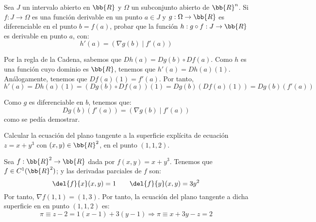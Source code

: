 \begin{ejercicio}
    Sea $J$ un intervalo abierto en $\bb{R}$ y $\Omega$ un subconjunto abierto de $\bb{R}^n$. Si $f:J\to \Omega$ es una función derivable en un punto $a\in J$ y $g:\Omega\to \bb{R}$ es diferenciable en el punto $b=f(a)$, probar que la función $h:g\circ f:J\to \bb{R}$ es derivable en punto $a$, con:
    \begin{equation*}
        h'(a) = (\nabla g(b)\mid f'(a))
    \end{equation*}

    Por la regla de la Cadena, sabemos que $Dh(a) = Dg(b)\circ Df(a)$.
    Como $h$ es una función cuyo dominio es $\bb{R}$, tenemos que $h'(a)=Dh(a)(1)$. Análogamente, tenemos que $Df(a)(1) = f'(a)$. Por tanto,
    \begin{equation*}
        h'(a) = Dh(a)(1) = (Dg(b)\circ Df(a))(1) = Dg(b)(Df(a)(1)) = Dg(b)(f'(a))
    \end{equation*}

    Como $g$ es diferenciable en $b$, tenemos que:
    \begin{equation*}
        Dg(b)(f'(a)) = \left(\nabla g(b)\mid f'(a)\right)
    \end{equation*}
    como se pedía demostrar.
\end{ejercicio}

\begin{ejercicio}
    Calcular la ecuación del plano tangente a la superficie explícita de ecuación $z = x + y^3$ con $(x,y)\in\bb{R}^2$, en el punto $(1,1,2)$.

    Sea $f:\bb{R}^2\to \bb{R}$ dada por $f(x,y) = x+y^3$. Tenemos que $f\in C^1(\bb{R}^2)$; y las derivadas parciales de $f$ son:
    \begin{equation*}
        \del{f}{x}(x,y) = 1
        \qquad 
        \del{f}{y}(x,y) = 3y^2
    \end{equation*}
    Por tanto, $\nabla f(1,1)=(1,3)$. Por tanto, la ecuación del plano tangente a dicha superficie en en punto $(1,1,2)$ es:
    \begin{equation*}
        \pi\equiv z-2 = 1(x-1) + 3(y-1) \Longrightarrow \pi\equiv x+3y-z=2
    \end{equation*}
\end{ejercicio}

